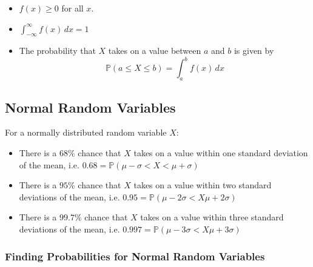 \documentclass[12pt letter]{report}
\begin{document}
\begin{itemize}
	\item $f \left( x \right) \geq 0$ for all $x$.
	\item $\int_{-\infty}^{\infty} f \left( x \right) \, dx = 1$
	\item The probability that $X$ takes on a value between $a$ and $b$ is given by
	      \[
		      \mathbb{P} \left( a \leq X \leq b \right) = \int_{a}^{b} f \left( x \right) \, dx
	      \]
\end{itemize}


\subsection{Normal Random Variables}


For a normally distributed random variable $X$:

\begin{itemize}
	\item There is a $68\%$ chance that $X$ takes on a value within one standard deviation of the mean, i.e. $0.68 = \mathbb{P}
		      \left( \mu - \sigma < X < \mu + \sigma  \right) $
	\item There is a $95\%$ chance that $X$ takes on a value within two standard deviations of the mean, i.e. $0.95 = \mathbb{P}
		      \left( \mu - 2 \sigma < X \mu + 2 \sigma  \right) $
	\item There is a $99.7\%$ chance that $X$ takes on a value within three standard deviations of the mean, i.e. $0.997 = \mathbb{P}
		      \left( \mu - 3 \sigma < X \mu + 3 \sigma  \right) $
\end{itemize}

\subsubsection{Finding Probabilities for Normal Random Variables}
\end{document}
